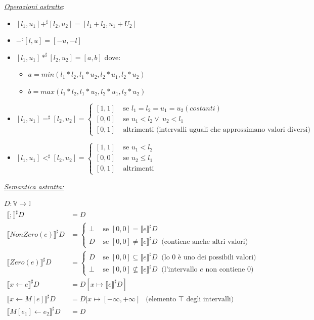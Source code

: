 \documentclass[a4paper, 11pt]{report}
\begin{document}
\noindent
\textit{\underline{Operazioni astratte}}:
\begin{itemize}
	\item $[l_1, u_1] +^\sharp [l_2, u_2] = [l_1 + l_2, u_1 + U_2]$
	\item $-^\sharp[l, u] = [-u, -l]$
	\item $[l_1, u_1] *^\sharp [l_2, u_2] = [a, b]$ dove:
	\begin{itemize}
		\item $a=min(l_1*l_2, l_1*u_2, l_2*u_1, l_2*u_2)$
		\item $b=max(l_1*l_2, l_1*u_2, l_2*u_1, l_2*u_2)$
	\end{itemize}
	\item $[l_1, u_1] =^\sharp [l_2, u_2] =
	\begin{cases}
	[1, 1] &\text{ se } l_1=l_2=u_1=u_2 (costanti) \\
	[0, 0] &\text{ se } u_1 < l_2 \lor ~u_2 < l_1\\
	[0, 1] &\text{ altrimenti (intervalli uguali che approssimano valori diversi) }
	\end{cases}$
	\item $[l_1, u_1] <^\sharp [l_2, u_2] =
	\begin{cases}
	[1, 1] &\text{ se } u_1<l_2 \\
	[0, 0] &\text{ se } u_2 \leq l_1 \\
	[0, 1] &\text{ altrimenti }
	\end{cases}$
\end{itemize}

\underline{\textit{Semantica astratta:}}

$D : \mathbb{V} \rightarrow \mathbb{I}$
\begin{align*}
\llbracket ; \rrbracket^\sharp D &= D\\
\llbracket NonZero(e) \rrbracket^\sharp D &=
\begin{cases}
\bot &\text{ se } [0, 0] = \llbracket e \rrbracket^\sharp D \\
D &\text{ se } [0, 0] \neq \llbracket e \rrbracket^\sharp D~ \text{ (contiene anche altri valori)}
\end{cases}\\
\llbracket Zero(e) \rrbracket^\sharp D &=
\begin{cases}
D &\text{ se } [0, 0] \subseteq \llbracket e \rrbracket^\sharp D~ \text{ (lo $0$ è uno dei possibili valori)} \\
\bot &\text{ se } [0, 0] \nsubseteq \llbracket e \rrbracket^\sharp D~ \text{ (l'intervallo $e$ non contiene $0$)}
\end{cases}\\
\llbracket x\leftarrow e \rrbracket^\sharp D &= D[x\mapsto \llbracket e\rrbracket^\sharp D]\\
\llbracket x\leftarrow M[e] \rrbracket^\sharp D &= D[x\mapsto [-\infty, +\infty]~~ \text{ (elemento $\top$ degli intervalli)}\\
\llbracket M[e_1]\leftarrow e_2 \rrbracket^\sharp D &= D
\end{align*}
\end{document}
